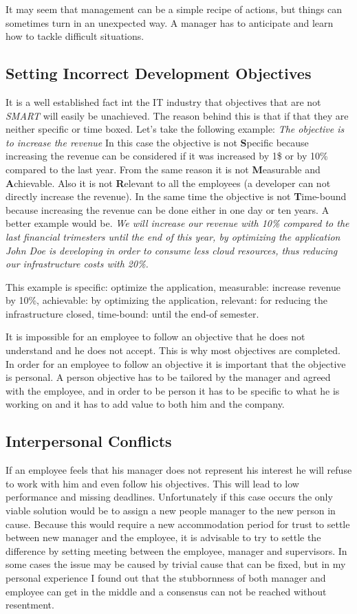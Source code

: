It may seem that management can be a simple recipe of actions, but things can sometimes turn in an unexpected way. A manager has to anticipate and learn how to tackle difficult situations.

\subsection{Setting Incorrect Development Objectives}
\label{subsec:devobjectives}
It is a well established fact int the IT industry that objectives that are not \textit{SMART} \cite{doran}  will easily be unachieved. The reason behind this is that if that they are neither specific or time boxed. Let's take the following example:
\textit{The objective is to increase the revenue}
In this case the objective is not \textbf{S}pecific because increasing the revenue can be considered if it was increased by 1\$ or by 10\% compared to the last year. From the same reason it is not \textbf{M}easurable and \textbf{A}chievable. Also it is not \textbf{R}elevant to all the employees (a developer can not directly increase the revenue). In the same time the objective is not \textbf{T}ime-bound because increasing the revenue can be done either in one day or ten years. A better example would be.
\textit{We will increase our revenue with 10\% compared to the last financial trimesters until the end of this year, by optimizing the application John Doe is developing in order to consume less cloud resources, thus reducing our infrastructure costs with 20\%.}

This example is specific: optimize the application, measurable: increase revenue by 10\%, achievable: by optimizing the application, relevant: for reducing the infrastructure closed, time-bound: until the end-of semester.

It is impossible for an employee to follow an objective that he does not understand and he does not accept. This is why most objectives are completed. In order for an employee to follow an objective it is important that the objective is personal. A person objective has to be tailored by the manager and agreed with the employee, and in order to be person it has to be specific to what he is working on and it has to add value to both him and the company.

\subsection{Interpersonal Conflicts}
\label{subsec:conflicts}
If an employee feels that his manager does not represent his interest he will refuse to work with him and even follow his objectives. This will lead to low performance and missing deadlines. Unfortunately if this case occurs the only viable solution would be to assign a new people manager to the new person in cause. Because this would require a new accommodation period for trust to settle between new manager and the employee, it is advisable to try to settle the difference by setting meeting between the employee, manager and supervisors. In some cases the issue may be caused by trivial cause that can be fixed, but in my personal experience I found out that the stubbornness of both manager and employee can get in the middle and a consensus can not be reached without resentment.
